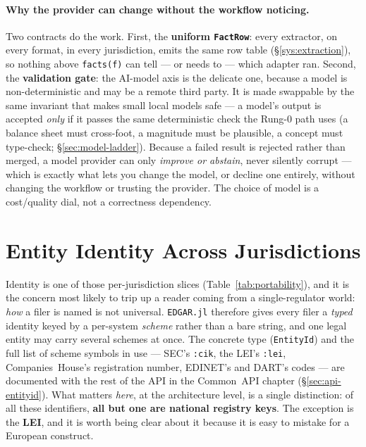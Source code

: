 \documentclass[11pt,a4paper]{report}
\begin{document}
\paragraph{Why the provider can change without the workflow noticing.} Two contracts do the work. First,
the \textbf{uniform \texttt{FactRow}}: every extractor, on every format, in every jurisdiction, emits the
same row table (\S\ref{sys:extraction}), so nothing above \texttt{facts(f)} can tell --- or needs to ---
which adapter ran. Second, the \textbf{validation gate}: the AI-model axis is the delicate one, because a
model is non-deterministic and may be a remote third party. It is made swappable by the same invariant
that makes small local models safe --- a model's output is accepted \emph{only} if it passes the same
deterministic check the Rung-0 path uses (a balance sheet must cross-foot, a magnitude must be plausible,
a concept must type-check; \S\ref{sec:model-ladder}). Because a failed result is rejected rather than
merged, a model provider can only \emph{improve or abstain}, never silently corrupt --- which is exactly
what lets you change the model, or decline one entirely, without changing the workflow or trusting the
provider. The choice of model is a cost/quality dial, not a correctness dependency.

\section{Entity Identity Across Jurisdictions}
\label{sec:identity}

Identity is one of those per-jurisdiction slices (Table~\ref{tab:portability}), and it is the concern most
likely to trip up a reader coming from a single-regulator world: \emph{how} a filer is named is not universal.
\texttt{EDGAR.jl} therefore gives every filer a \emph{typed} identity keyed by a per-system \emph{scheme} rather
than a bare string, and one legal entity may carry several schemes at once. The concrete type
(\texttt{EntityId}) and the full list of scheme symbols in use --- SEC's \texttt{:cik}, the LEI's \texttt{:lei},
Companies~House's registration number, EDINET's and DART's codes --- are documented with the rest of the API in
the Common~API chapter (\S\ref{sec:api-entityid}). What matters \emph{here}, at the architecture level, is a
single distinction: of all these identifiers, \textbf{all but one are national registry keys}. The exception is
the \textbf{LEI}, and it is worth being clear about it because it is easy to mistake for a European construct.
\end{document}
